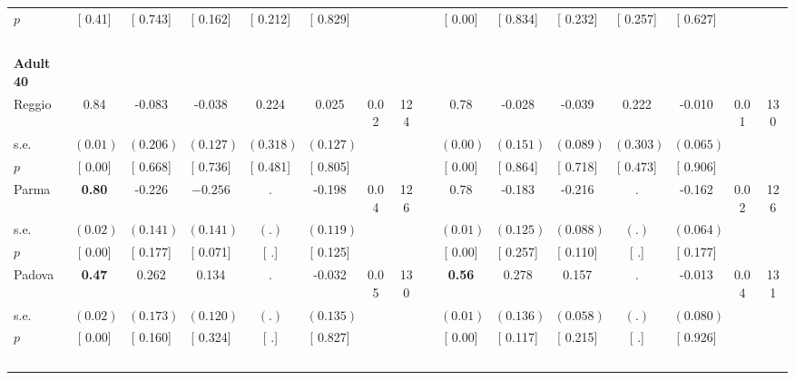 \begin{longtable}{L{8em} c c c c c c c p{1em} c c c c c c c}
\quad \quad \quad \quad $ p$ & [     0.41] & [    0.743] & [    0.162] & [    0.212] & [    0.829] & & & & [     0.00] & [    0.834] & [    0.232] & [    0.257] & [    0.627] & &  \\[1em]
~\\[1em]
\quad \quad \textbf{Adult 40} & & & & & & & & & & & & & & & \\* 
\quad \quad \quad Reggio& 0.84 &    -0.083 &    -0.038 &     0.224 &     0.025 &      0.02 &       124 & & 0.78 &    -0.028 &    -0.039 &     0.222 &    -0.010 &      0.01 &       130  \\*
\quad \quad \quad \quad s.e.& $ (     0.01)$ & $ (    0.206)$ & $ (    0.127)$ & $ (    0.318)$ & $ (    0.127)$ & & & & $ (     0.00)$ & $ (    0.151)$ & $ (    0.089)$ & $ (    0.303)$ & $ (    0.065)$ & &  \\*
\quad \quad \quad \quad $ p$ & [     0.00] & [    0.668] & [    0.736] & [    0.481] & [    0.805] & & & & [     0.00] & [    0.864] & [    0.718] & [    0.473] & [    0.906] & &  \\[1em]
\quad \quad \quad Parma& \textbf{     0.80} &    -0.226 & $ \mathbf{   -0.256}$ &         . &    -0.198 &      0.04 &       126 & & 0.78 &    -0.183 &    -0.216 &         . &    -0.162 &      0.02 &       126  \\*
\quad \quad \quad \quad s.e.& $ (     0.02)$ & $ (    0.141)$ & $ (    0.141)$ & $ (        .)$ & $ (    0.119)$ & & & & $ (     0.01)$ & $ (    0.125)$ & $ (    0.088)$ & $ (        .)$ & $ (    0.064)$ & &  \\*
\quad \quad \quad \quad $ p$ & [     0.00] & [    0.177] & [    0.071] & [        .] & [    0.125] & & & & [     0.00] & [    0.257] & [    0.110] & [        .] & [    0.177] & &  \\[1em]
\quad \quad \quad Padova& \textbf{     0.47} &     0.262 &     0.134 &         . &    -0.032 &      0.05 &       130 & & \textbf{     0.56} &     0.278 &     0.157 &         . &    -0.013 &      0.04 &       131  \\*
\quad \quad \quad \quad s.e.& $ (     0.02)$ & $ (    0.173)$ & $ (    0.120)$ & $ (        .)$ & $ (    0.135)$ & & & & $ (     0.01)$ & $ (    0.136)$ & $ (    0.058)$ & $ (        .)$ & $ (    0.080)$ & &  \\*
\quad \quad \quad \quad $ p$ & [     0.00] & [    0.160] & [    0.324] & [        .] & [    0.827] & & & & [     0.00] & [    0.117] & [    0.215] & [        .] & [    0.926] & &  \\[1em]
~\\[1em]

\end{longtable}
